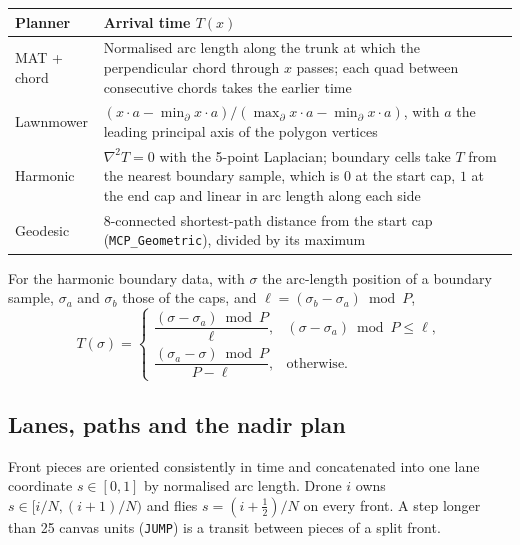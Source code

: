 \documentclass[11pt,a4paper]{article}
\newcommand{\code}[1]{\texttt{#1}}
\begin{document}
\begin{center}
\begin{tabularx}{\linewidth}{@{}lX@{}}
\toprule
Planner & Arrival time $T(x)$ \\
\midrule
MAT + chord & Normalised arc length along the trunk at which the perpendicular chord through $x$ passes; each quad between consecutive chords takes the earlier time \\
Lawnmower & $(x\cdot a - \min_\partial x\cdot a)/(\max_\partial x\cdot a-\min_\partial x\cdot a)$, with $a$ the leading principal axis of the polygon vertices \\
Harmonic & $\nabla^2T=0$ with the 5-point Laplacian; boundary cells take $T$ from the nearest boundary sample, which is $0$ at the start cap, $1$ at the end cap and linear in arc length along each side \\
Geodesic & 8-connected shortest-path distance from the start cap (\code{MCP\_Geometric}), divided by its maximum \\
\bottomrule
\end{tabularx}
\end{center}

For the harmonic boundary data, with $\sigma$ the arc-length position of a boundary sample, $\sigma_a$ and
$\sigma_b$ those of the caps, and $\ell = (\sigma_b-\sigma_a)\bmod P$,
\begin{equation}
T(\sigma) = \begin{cases}
\dfrac{(\sigma-\sigma_a)\bmod P}{\ell}, & (\sigma-\sigma_a)\bmod P \le \ell,\\[8pt]
\dfrac{(\sigma_a-\sigma)\bmod P}{P-\ell}, & \text{otherwise.}
\end{cases}
\end{equation}

\subsection{Lanes, paths and the nadir plan}

Front pieces are oriented consistently in time and concatenated into one lane coordinate $s\in[0,1]$ by
normalised arc length. Drone $i$ owns $s\in[i/N,(i+1)/N)$ and flies $s=(i+\tfrac12)/N$ on every front. A
step longer than 25 canvas units (\code{JUMP}) is a transit between pieces of a split front.
\end{document}
